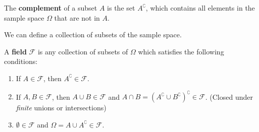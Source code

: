 \documentclass{huhtakm-template-book}
\begin{document}
    \begin{defn} %
        The \textbf{complement} of a subset $A$ is the set $A^{\complement}$, which contains all elements in the sample space $\Omega$ that are not in $A$.
    \end{defn}
    We can define a collection of subsets of the sample space.
    \begin{defn} %
        A \textbf{field} $\mathcal{F}$ is any collection of subsets of $\Omega$ which satisfies the following conditions:
        \begin{enumerate}
            \item If $A\in\mathcal{F}$, then $A^{\complement}\in\mathcal{F}$.
            \item If $A,B\in\mathcal{F}$, then $A\cup B\in\mathcal{F}$ and $A\cap B=(A^{\complement}\cup B^{\complement})^{\complement}\in\mathcal{F}$. (Closed under \textit{finite} unions or intersections)
            \item $\emptyset\in\mathcal{F}$ and $\Omega=A\cup A^{\complement}\in\mathcal{F}$.
        \end{enumerate}
    \end{defn}
\end{document}
